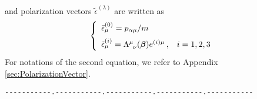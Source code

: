 and polarization vectors $\tilde{\epsilon}^{(\lambda)}$ are written as
\begin{eqnarray}
\left\{
\begin{array}{l}
\tilde{\epsilon}^{(0)}_\mu = p_{\alpha \mu} / m
\vspace{2mm}
\\
\tilde{\epsilon}^{(i)}_\mu = \Lambda^\mu_{\;\;\nu} (\bld{\beta}) e^{(i)\mu}
\,,
\hspace{3mm}
i = 1, 2, 3
\end{array}
\right.
\label{eqn:StueckelPolVecs}
\end{eqnarray}
For notations of the second equation, we refer to Appendix \ref{sec:PolarizationVector}.

\bigskip

\verb/-----------.-----------.-----------.-----------.-----------/\\
\vspace{-3mm}
